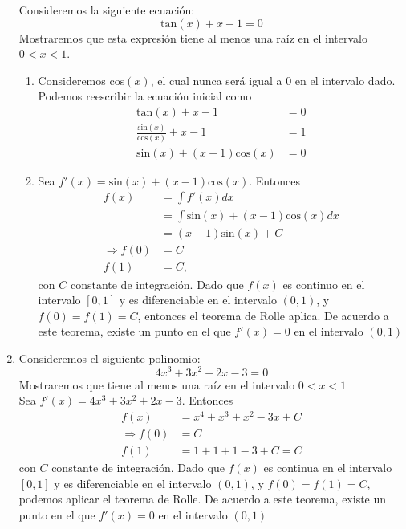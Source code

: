 \documentclass[letter]{article}
\begin{document}
\begin{enumerate}
    Consideremos la siguiente ecuación:
    $$\text{tan}(x)+x-1=0$$
    Mostraremos que esta expresión tiene al menos una raíz en el intervalo $0<x<1$.
    \begin{enumerate}
        \item Consideremos cos$(x)$, el cual nunca será igual a $0$ en el intervalo dado. Podemos reescribir la ecuación inicial como
        \begin{equation*}
            \begin{split}
                \text{tan}(x)+x-1 
                &= 0\\
                \frac{\text{sin}(x)}{\text{cos}(x)}+x-1 
                &= 1\\
                \text{sin}(x)+(x-1)\text{cos}(x)
                &= 0
            \end{split}
        \end{equation*}
        \item Sea $f'(x)=\text{sin}(x)+(x-1)\text{cos}(x)$. Entonces
        \begin{equation*}
            \begin{split}
                f(x) 
                &= \int f'(x)dx\\
                &= \int\text{sin}(x)+(x-1)\text{cos}(x)dx\\
                &= (x-1)\text{sin}(x)+C\\
                \Rightarrow f(0) 
                &= C\\
                f(1)
                &= C,
            \end{split}
        \end{equation*}
        con $C$ constante de integración. Dado que $f(x)$ es continuo en el intervalo $[0,1]$ y es diferenciable en el intervalo $(0,1)$, y $f(0)=f(1)=C$, entonces el teorema de Rolle aplica. De acuerdo a este teorema, existe un punto en el que $f'(x)=0$ en el intervalo $(0,1)$
    \end{enumerate}
    
    \item %
    Consideremos el siguiente polinomio: 
    $$4x^{3}+3x^{2}+2x-3=0$$
    Mostraremos que tiene al menos una raíz en el intervalo $0<x<1$
    \vspace{2mm}\\
    Sea $f'(x)=4x^{3}+3x^{2}+2x-3$. Entonces
    \begin{equation*}
        \begin{split}
            f(x) 
            &= x^{4}+x^{3}+x^{2}-3x+C\\
            \Rightarrow f(0)
            &= C\\
            f(1)
            &= 1+1+1-3+C=C
        \end{split}
    \end{equation*}
    con $C$ constante de integración. Dado que $f(x)$ es continua en el intervalo $[0,1]$ y es diferenciable en el intervalo $(0,1)$, y $f(0)=f(1)=C$, podemos aplicar el teorema de Rolle. De acuerdo a este teorema, existe un punto en el que $f'(x)=0$ en el intervalo $(0,1)$
\end{enumerate}
\end{document}
